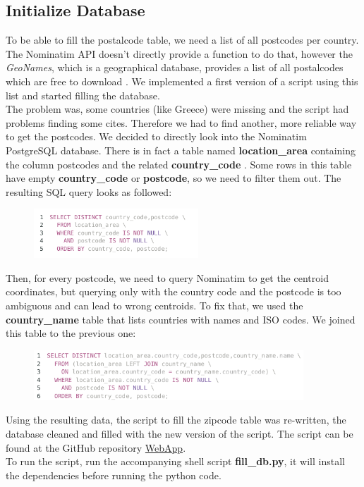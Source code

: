 \documentclass[12pt]{article}
\begin{document}
\subsection{Initialize Database}
To be able to fill the postalcode table, we need a list of all postcodes per country. The Nominatim API doesn't directly provide a function to do that, however the \emph{GeoNames}, which is a geographical database, provides a list of all postalcodes which are free to download \citep{GeoNames}.
We implemented a first version of a script using this list and started filling the database.\\
The problem was, some countries (like Greece) were missing and the script had problems finding some cites.  Therefore we had to find another, more reliable way to get the postcodes.
We decided to directly look into the Nominatim PostgreSQL database. There is in fact a table named
\textbf{location\_area} containing the column postcodes and the related \textbf{country\_code} .
Some rows in this table have empty \textbf{country\_code} or \textbf{postcode}, so we need to filter them out. The resulting SQL query looks as followed:
\begin{figure}[H]
\hspace{1.2cm}
\includegraphics[width=0.55\textwidth]{img/query1}\label{pic:q1}
\end{figure}
\noindent Then, for every postcode, we need to query Nominatim to get the centroid coordinates, but querying only with the country code and the postcode is too ambiguous and can lead to wrong centroids. To fix that, we used the \textbf{country\_name} table that lists countries with names and ISO codes. We joined this table to the previous one:
\begin{figure}[H]
\hspace{1.2cm}
\includegraphics[width=0.9\textwidth]{img/query2}\label{pic:q2}
\end{figure}
\noindent Using the resulting data, the script to fill the zipcode table was re-written, the database cleaned and filled with the new version of the script. The script can be found at the GitHub repository \href{https://github.com/dataBikeHsUlm/WebApp/blob/master/fill_db_from_osm.py}{WebApp}. \\To run the script, run the accompanying shell script \textbf{fill\_db.py}, it will install the dependencies before running the python code.
\end{document}
